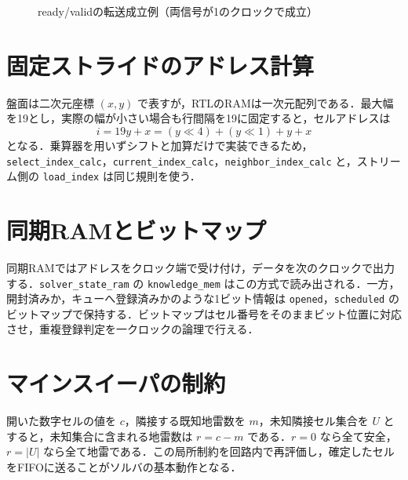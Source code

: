 \begin{figure}[tb]
\centering
{}
\caption{ready/validの転送成立例（両信号が1のクロックで成立）}
\label{fig:ready-valid}
\end{figure}

\section{固定ストライドのアドレス計算}
盤面は二次元座標 \((x,y)\) で表すが，RTLのRAMは一次元配列である．最大幅を19とし，実際の幅が小さい場合も行間隔を19に固定すると，セルアドレスは
\[
  i=19y+x=(y\ll4)+(y\ll1)+y+x
\]
となる．乗算器を用いずシフトと加算だけで実装できるため，\texttt{select\_index\_calc}，\texttt{current\_index\_calc}，\texttt{neighbor\_index\_calc} と，ストリーム側の \texttt{load\_index} は同じ規則を使う．

\section{同期RAMとビットマップ}
同期RAMではアドレスをクロック端で受け付け，データを次のクロックで出力する．\texttt{solver\_state\_ram} の \texttt{knowledge\_mem} はこの方式で読み出される．一方，開封済みか，キューへ登録済みかのような1ビット情報は \texttt{opened}，\texttt{scheduled} のビットマップで保持する．ビットマップはセル番号をそのままビット位置に対応させ，重複登録判定を一クロックの論理で行える．

\section{マインスイーパの制約}
開いた数字セルの値を \(c\)，隣接する既知地雷数を \(m\)，未知隣接セル集合を \(U\) とすると，未知集合に含まれる地雷数は \(r=c-m\) である．\(r=0\) なら全て安全，\(r=|U|\) なら全て地雷である．この局所制約を回路内で再評価し，確定したセルをFIFOに送ることがソルバの基本動作となる．

